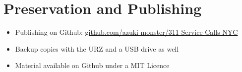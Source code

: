 \documentclass{beamer}
\begin{document}
\section{Preservation and Publishing}
\begin{frame}
\begin{itemize}
\frametitle{Preservation and Publishing}
\item Publishing on Github: \url{github.com/azuki-monster/311-Service-Calls-NYC}
\vfill
\item Backup copies with the URZ and a USB drive as well
\vfill
\item Material available on Github under a MIT Licence
\end{itemize}
\end{frame}
\end{document}
